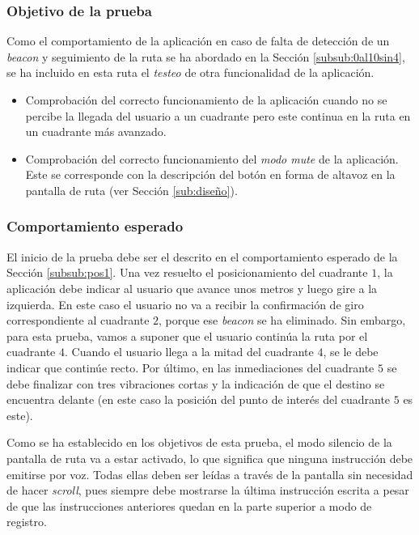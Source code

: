 \subsubsection*{Objetivo de la prueba}

Como el comportamiento de la aplicación en caso de falta de detección de un \textit{beacon} y seguimiento de la ruta se ha abordado en la Sección \ref{subsub:0al10sin4}, se ha incluido en esta ruta el \textit{testeo} de otra funcionalidad de la aplicación. 

\begin{itemize}
	\item Comprobación del correcto funcionamiento de la aplicación cuando no se percibe la llegada del usuario a un cuadrante pero este continua en la ruta en un cuadrante más avanzado.
	
	\item Comprobación del correcto funcionamiento del \textit{modo mute} de la aplicación. Este se corresponde con la descripción del botón en forma de altavoz en la pantalla de ruta (ver Sección \ref{sub:diseño}). 
\end{itemize}


\subsubsection*{Comportamiento esperado}

El inicio de la prueba debe ser el descrito en el comportamiento esperado de la Sección \ref{subsub:pos1}. Una vez resuelto el posicionamiento del cuadrante $1$, la aplicación debe indicar al usuario que avance unos metros y luego gire a la izquierda. En este caso el usuario no va a recibir la confirmación de giro correspondiente al cuadrante $2$, porque ese \textit{beacon} se ha eliminado. Sin embargo, para esta prueba, vamos a suponer que el usuario continúa la ruta por el cuadrante $4$. Cuando el usuario llega a la mitad del cuadrante $4$, se le debe indicar que continúe recto. Por último, en las inmediaciones del cuadrante $5$ se debe finalizar con tres vibraciones cortas y la indicación de que el destino se encuentra delante (en este caso la posición del punto de interés del cuadrante $5$ es este).

Como se ha establecido en los objetivos de esta prueba, el modo silencio de la pantalla de ruta va a estar activado, lo que significa que ninguna instrucción debe emitirse por voz. Todas ellas deben ser leídas a través de la pantalla sin necesidad de hacer \textit{scroll}, pues siempre debe mostrarse la última instrucción escrita a pesar de que las instrucciones anteriores quedan en la parte superior a modo de registro. 


